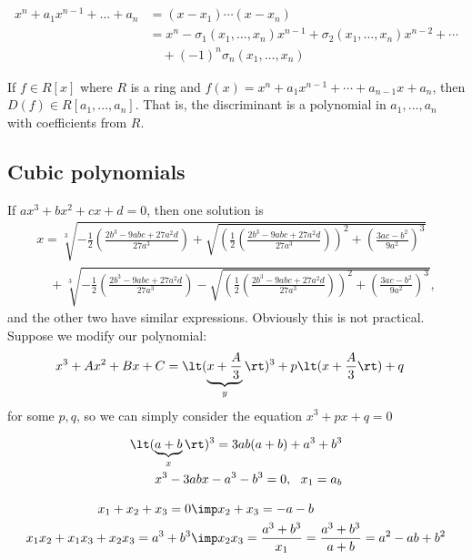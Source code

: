 \documentclass[a4paper]{article}
\begin{document}
\begin{ttheorem}
\begin{align*}
  x^n+a_1x^{n-1}+\ldots+a_n &= (x-x_1)\cdots(x-x_n) \\
  &= x^n-\sigma_1(x_1,\ldots, x_n)x^{n-1}+\sigma_2(x_1,\ldots, x_n)x^{n-2}+\cdots\\
  &\quad+(-1)^n\sigma_n(x_1,\ldots, x_n)
\end{align*}
\end{ttheorem}

\begin{tcorollary}
  If $ f\in R[x] $ where $ R $ is a ring and $ f(x) = x^n + a_{1}x^{n-1} + \cdots + a_{n-1}x + a_n $, then $ D(f)\in R[a_1,\ldots,a_n] $. That is, the discriminant is a polynomial in $ a_1,\ldots,a_n $ with coefficients from $ R $.
\end{tcorollary}

\subsection{Cubic polynomials}
If \( ax^3+bx^2+cx+d = 0 \), then one solution is
\begin{align*}
  x = \sqrt[3]{-\frac{1}{2} \left(\frac{2b^3 - 9abc + 27a^2d}{27a^3}\right) + \sqrt{\left(\frac{1}{2} \left(\frac{2b^3 - 9abc + 27a^2d}{27a^3}\right)\right)^2 + \left(\frac{3ac - b^2}{9a^2}\right)^3}} \\
  \quad + \sqrt[3]{-\frac{1}{2} \left(\frac{2b^3 - 9abc + 27a^2d}{27a^3}\right) - \sqrt{\left(\frac{1}{2} \left(\frac{2b^3 - 9abc + 27a^2d}{27a^3}\right)\right)^2 + \left(\frac{3ac - b^2}{9a^2}\right)^3}},
\end{align*}
and the other two have similar expressions.
Obviously this is not practical.
Suppose we modify our polynomial:
\begin{align*}
  x^3+Ax^2+Bx+C &= \lt(\underbrace{x+\frac{A}{3}}_{y}\rt)^3+p\lt(x+\frac{A}{3}\rt) + q
\end{align*}
for some $ p,q $, so we can simply consider the equation $ x^3+px+q = 0 $

\begin{align*}
  \lt(\underbrace{a+b}_x\rt)^3 = 3ab(a+b) + a^3+b^3 \\
  x^3-3abx-a^3-b^3 = 0,\ \ x_1= a_b
\end{align*}

\begin{align*}
  x_1+x_2+x_3 = 0 &\imp x_2+x_3 = -a-b \\
  x_1x_2+x_1x_3+x_2x_3 = a^3+b^3 &\imp x_2x_3 = \frac{a^3+b^3}{x_1} = \frac{a^3+b^3}{a+b} = a^2-ab+b^2
\end{align*}
\end{document}
